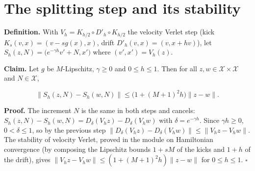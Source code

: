 \documentclass[11pt,a4paper]{article}
\begin{document}
\section{\texorpdfstring{The splitting step and its stability}{The splitting step and its stability}}


\textbf{Definition.} With \(V_h=K_{h/2}\circ D'_h\circ K_{h/2}\) the velocity Verlet step (kick \(K_s(v,x)=(v-sg(x),x)\), drift \(D'_h(v,x)=(v,x+hv)\)), let \(S_h(z,N)=\bigl(e^{-\gamma h}v'+N,x'\bigr)\) where \((v',x')=V_h(z)\).




\textbf{Claim.} Let \(g\) be \(M\)-Lipschitz, \(\gamma\ge0\) and \(0\le h\le1\). Then for all \(z,w\in\mathcal X\times\mathcal X\) and \(N\in\mathcal X\),


\[\|S_h(z,N)-S_h(w,N)\|\le\bigl(1+(M+1)^2h\bigr)\|z-w\| .\]


\textbf{Proof.} The increment \(N\) is the same in both steps and cancels: \(S_h(z,N)-S_h(w,N)=D_\delta(V_hz)-D_\delta(V_hw)\) with \(\delta=e^{-\gamma h}\). Since \(\gamma h\ge0\), \(0<\delta\le1\), so by the previous step \(\|D_\delta(V_hz)-D_\delta(V_hw)\|\le\|V_hz-V_hw\|\). The stability of velocity Verlet, proved in the module on Hamiltonian convergence (by composing the Lipschitz bounds \(1+sM\) of the kicks and \(1+h\) of the drift), gives \(\|V_hz-V_hw\|\le(1+(M+1)^2h)\|z-w\|\) for \(0\le h\le1\). \(\square\)
\end{document}
